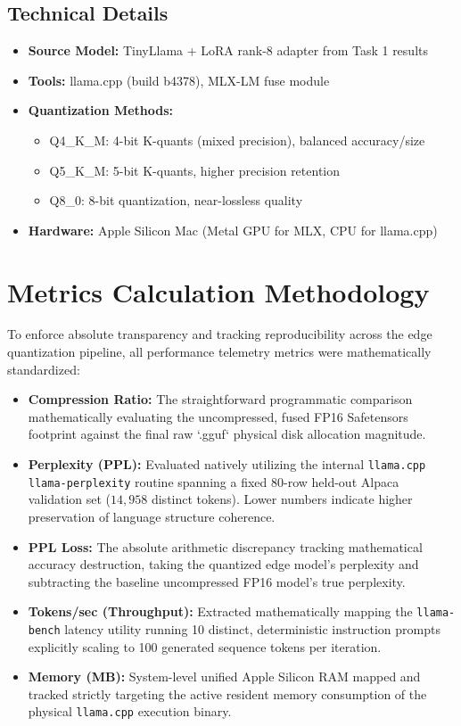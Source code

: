 \documentclass[11pt,a4paper]{article}
\begin{document}
\subsection*{Technical Details}
\begin{itemize}
    \item \textbf{Source Model:} TinyLlama + LoRA rank-8 adapter from Task 1 results
    \item \textbf{Tools:} llama.cpp (build b4378), MLX-LM fuse module
    \item \textbf{Quantization Methods:}
    \begin{itemize}
        \item Q4\_K\_M: 4-bit K-quants (mixed precision), balanced accuracy/size
        \item Q5\_K\_M: 5-bit K-quants, higher precision retention
        \item Q8\_0: 8-bit quantization, near-lossless quality
    \end{itemize}
    \item \textbf{Hardware:} Apple Silicon Mac (Metal GPU for MLX, CPU for llama.cpp)
\end{itemize}

\section*{Metrics Calculation Methodology}
To enforce absolute transparency and tracking reproducibility across the edge quantization pipeline, all performance telemetry metrics were mathematically standardized:
\begin{itemize}
    \item \textbf{Compression Ratio:} The straightforward programmatic comparison mathematically evaluating the uncompressed, fused FP16 Safetensors footprint against the final raw `.gguf` physical disk allocation magnitude.
    \item \textbf{Perplexity (PPL):} Evaluated natively utilizing the internal \texttt{llama.cpp} \texttt{llama-perplexity} routine spanning a fixed 80-row held-out Alpaca validation set ($14,958$ distinct tokens). Lower numbers indicate higher preservation of language structure coherence.
    \item \textbf{PPL Loss:} The absolute arithmetic discrepancy tracking mathematical accuracy destruction, taking the quantized edge model's perplexity and subtracting the baseline uncompressed FP16 model's true perplexity. 
    \item \textbf{Tokens/sec (Throughput):} Extracted mathematically mapping the \texttt{llama-bench} latency utility running 10 distinct, deterministic instruction prompts explicitly scaling to 100 generated sequence tokens per iteration.
    \item \textbf{Memory (MB):} System-level unified Apple Silicon RAM mapped and tracked strictly targeting the active resident memory consumption of the physical \texttt{llama.cpp} execution binary.
\end{itemize}
\end{document}
